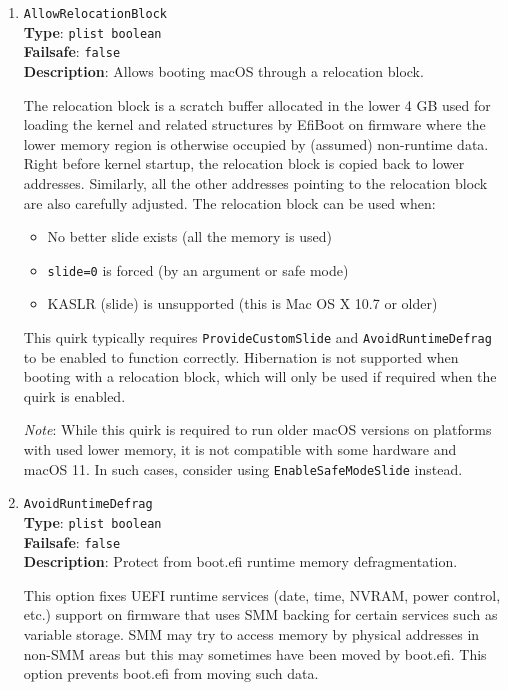 \documentclass[]{article}
\providecommand{\tightlist}{%
  \setlength{\itemsep}{0pt}\setlength{\parskip}{0pt}}
\begin{document}
\begin{enumerate}

\item
  \texttt{AllowRelocationBlock}\\
  \textbf{Type}: \texttt{plist\ boolean}\\
  \textbf{Failsafe}: \texttt{false}\\
  \textbf{Description}: Allows booting macOS through a relocation block.

  The relocation block is a scratch buffer allocated in the lower 4 GB used
  for loading the kernel and related structures by EfiBoot on firmware where
  the lower memory region is otherwise occupied by (assumed) non-runtime data.
  Right before kernel startup, the relocation block is copied back to lower
  addresses. Similarly, all the other addresses pointing to the relocation
  block are also carefully adjusted. The relocation block can be used when:

  \begin{itemize}
    \tightlist
    \item No better slide exists (all the memory is used)
    \item \texttt{slide=0} is forced (by an argument or safe mode)
    \item KASLR (slide) is unsupported (this is Mac OS X 10.7 or older)
  \end{itemize}

  This quirk typically requires \texttt{ProvideCustomSlide} and
  \texttt{AvoidRuntimeDefrag} to be enabled to function
  correctly. Hibernation is not supported when booting with a relocation
  block, which will only be used if required when the quirk is enabled.

  \emph{Note}: While this quirk is required to run older macOS versions
  on platforms with used lower memory, it is not compatible with some
  hardware and macOS 11. In such cases, consider using
  \texttt{EnableSafeModeSlide} instead.

\item
  \texttt{AvoidRuntimeDefrag}\\
  \textbf{Type}: \texttt{plist\ boolean}\\
  \textbf{Failsafe}: \texttt{false}\\
  \textbf{Description}: Protect from boot.efi runtime memory defragmentation.

  This option fixes UEFI runtime services (date, time, NVRAM, power control, etc.)
  support on firmware that uses SMM backing for certain services such as variable
  storage. SMM may try to access memory by physical addresses in non-SMM areas but
  this may sometimes have been moved by boot.efi. This option prevents boot.efi
  from moving such data.


\end{enumerate}
\end{document}
